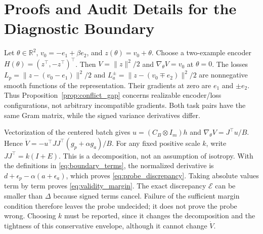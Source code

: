\documentclass{article}
\begin{document}
\section{Proofs and Audit Details for the Diagnostic Boundary}\label{app:boundary_proof}






Let $\theta\in\mathbb R^2$, $v_0=-e_1+\beta e_2$, and $z(\theta)=v_0+\theta$.
Choose a two-example encoder $H(\theta)=(z^\top,-z^\top)^\top$.
Then $V=\|z\|^2/2$ and $\nabla_\theta V=v_0$ at $\theta=0$.
The losses $L_p=\|z-(v_0-e_1)\|^2/2$ and
$L_a^\pm=\|z-(v_0\mp e_2)\|^2/2$ are nonnegative smooth functions
of the representation. Their gradients at zero are $e_1$ and $\pm e_2$.
Thus Proposition~\ref{prop:conflict_gap} concerns realizable encoder/loss
configurations, not arbitrary incompatible gradients. Both task pairs have
the same Gram matrix, while the signed variance derivatives differ.

Vectorization of the centered batch gives $u=(C_B\otimes I_m)h$ and
$\nabla_\theta V=J^\top u/B$. Hence
$\dot V=-u^\top JJ^\top(g_p+\alpha g_a)/B$.
For any fixed positive scale $k$, write $JJ^\top=k(I+E)$.
This is a decomposition, not an assumption of isotropy.
With the definitions in \eqref{eq:boundary_terms}, the normalized derivative is
$d+\epsilon_p-\alpha(a+\epsilon_a)$, which proves
\eqref{eq:probe_discrepancy}. Taking absolute values term by term proves
\eqref{eq:validity_margin}. The exact discrepancy $\mathcal E$ can be smaller
than $\Delta$ because signed terms cancel. Failure of the sufficient margin
condition therefore leaves the probe undecided; it does not prove the probe wrong.
Choosing $k$ must be reported, since it changes the decomposition and the tightness
of this conservative envelope, although it cannot change $\dot V$.
\end{document}
